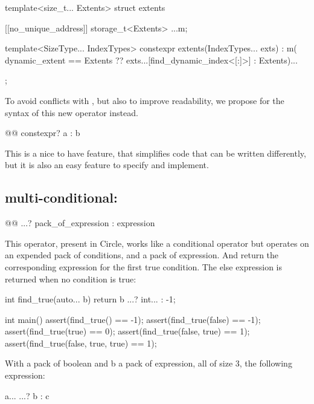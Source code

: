 \documentclass{wg21}
\begin{document}
\begin{colorblock}
template<size_t... Extents>
struct extents {
    [[no_unique_address]] storage_t<Extents> ...m;

    template<SizeType... IndexTypes>
    constexpr extents(IndexTypes... exts) :
        m( dynamic_extent == Extents ??  exts...[find_dynamic_index<[:]>] : Extents)... { }
};
\end{colorblock}

To avoid conflicts with , but also to improve readability, we propose  for the syntax of this new operator instead.

\begin{colorblock}
@@ constexpr? a : b
\end{colorblock}

This is a nice to have feature, that simplifies code that can be written differently, but it is also an easy feature to specify and implement.

\subsection{multi-conditional: }

\begin{colorblock}
@@ ...? pack_of_expression : expression
\end{colorblock}

This operator, present in Circle, works like a conditional operator but operates on an expended pack of conditions, and a pack of expression.
And return the corresponding expression for the first true condition. The else expression is returned when no condition is true:

\begin{colorblock}
int find_true(auto... b) {
    return b ...? int... : -1;
}

int main() {
    assert(find_true() == -1);
    assert(find_true(false) == -1);
    assert(find_true(true) == 0);
    assert(find_true(false, true) == 1);
    assert(find_true(false, true, true) == 1);
}
\end{colorblock}

With a pack of boolean and b a pack of expression, all of size 3, the following expression:

\begin{colorblock}
a... ...? b : c
\end{colorblock}
\end{document}
